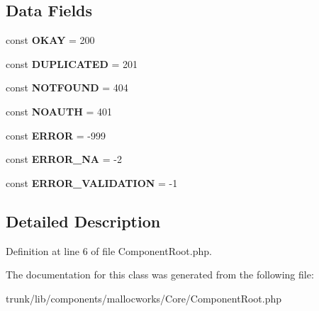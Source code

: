 \subsection*{Data Fields}
\begin{DoxyCompactItemize}
\item 
\hypertarget{class_utopia_1_1_components_1_1_core_1_1_component_root_a88611ee29b7698dd27a512bb1e8665b2}{
const {\bfseries OKAY} = 200}
\label{class_utopia_1_1_components_1_1_core_1_1_component_root_a88611ee29b7698dd27a512bb1e8665b2}

\item 
\hypertarget{class_utopia_1_1_components_1_1_core_1_1_component_root_add9f17cd5306bf58a7078b9511aa2a8c}{
const {\bfseries DUPLICATED} = 201}
\label{class_utopia_1_1_components_1_1_core_1_1_component_root_add9f17cd5306bf58a7078b9511aa2a8c}

\item 
\hypertarget{class_utopia_1_1_components_1_1_core_1_1_component_root_ac1beb8709364a7a10f0b42e62e15aa37}{
const {\bfseries NOTFOUND} = 404}
\label{class_utopia_1_1_components_1_1_core_1_1_component_root_ac1beb8709364a7a10f0b42e62e15aa37}

\item 
\hypertarget{class_utopia_1_1_components_1_1_core_1_1_component_root_a2cfce9d842aa4a3d7e76f2e6aa503161}{
const {\bfseries NOAUTH} = 401}
\label{class_utopia_1_1_components_1_1_core_1_1_component_root_a2cfce9d842aa4a3d7e76f2e6aa503161}

\item 
\hypertarget{class_utopia_1_1_components_1_1_core_1_1_component_root_a7f79d7b73cfb40bb7855d4260393cc0f}{
const {\bfseries ERROR} = -\/999}
\label{class_utopia_1_1_components_1_1_core_1_1_component_root_a7f79d7b73cfb40bb7855d4260393cc0f}

\item 
\hypertarget{class_utopia_1_1_components_1_1_core_1_1_component_root_a8ad0ae7713549ace43b30d7abd955c84}{
const {\bfseries ERROR\_\-NA} = -\/2}
\label{class_utopia_1_1_components_1_1_core_1_1_component_root_a8ad0ae7713549ace43b30d7abd955c84}

\item 
\hypertarget{class_utopia_1_1_components_1_1_core_1_1_component_root_a36ce61aea7d686269612444e276079de}{
const {\bfseries ERROR\_\-VALIDATION} = -\/1}
\label{class_utopia_1_1_components_1_1_core_1_1_component_root_a36ce61aea7d686269612444e276079de}

\end{DoxyCompactItemize}


\subsection{Detailed Description}


Definition at line 6 of file ComponentRoot.php.



The documentation for this class was generated from the following file:\begin{DoxyCompactItemize}
\item 
trunk/lib/components/mallocworks/Core/ComponentRoot.php\end{DoxyCompactItemize}
